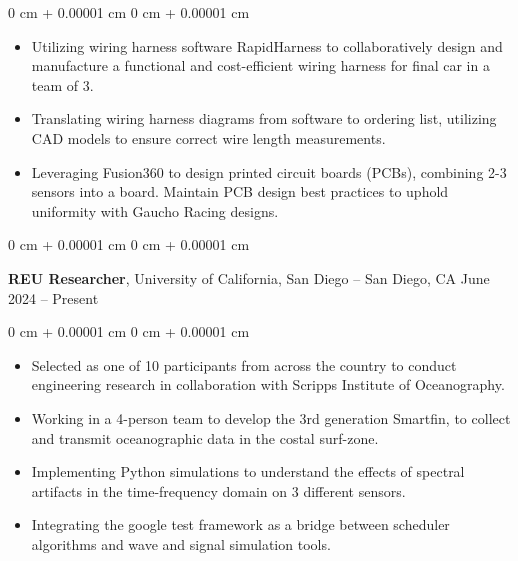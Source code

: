 \documentclass[10pt, letterpaper]{article}
\newenvironment{highlights}{
    \begin{itemize}[
        topsep=0.10 cm,
        parsep=0.10 cm,
        partopsep=0pt,
        itemsep=0pt,
        leftmargin=0 cm + 10pt
    ]
}{
    \end{itemize}
} %
\newenvironment{onecolentry}{
    \begin{adjustwidth}{
        0 cm + 0.00001 cm
    }{
        0 cm + 0.00001 cm
    }
}{
    \end{adjustwidth}
} %
\newenvironment{twocolentry}[2][]{
    \onecolentry
    \def\secondColumn{#2}
    \setcolumnwidth{\fill, 4.5 cm}
    \begin{paracol}{2}
}{
    \switchcolumn \raggedleft \secondColumn
    \end{paracol}
    \endonecolentry
} %
\begin{document}
    \vspace{0.10 cm}
    \begin{onecolentry}
        \begin{highlights}
            \item Utilizing wiring harness software RapidHarness to collaboratively design and manufacture a functional and cost-efficient wiring harness for final car in a team of 3.
            \item Translating wiring harness diagrams from software to ordering list, utilizing CAD models to ensure correct wire length measurements. 
            \item Leveraging Fusion360 to design printed circuit boards (PCBs), combining 2-3 sensors into a board. Maintain PCB design best practices to uphold uniformity with Gaucho Racing designs.
        \end{highlights}
    \end{onecolentry}
    



    \vspace{0.2 cm}

     \begin{twocolentry}{
        June 2024 – Present
    }
    
    \textbf{REU Researcher}, University of California, San Diego -- San Diego, CA\end{twocolentry}
    
    \vspace{0.1 cm}

    \begin{onecolentry}
        \begin{highlights}
            \item Selected as one of 10 participants from across the country to conduct engineering research in collaboration with Scripps Institute of Oceanography.
            \item Working in a 4-person team to develop the 3rd generation Smartfin, to collect and transmit oceanographic data in the costal surf-zone.
            \item Implementing Python simulations to understand the effects of spectral artifacts in the time-frequency domain on 3 different sensors. 
            \item Integrating the google test framework as a bridge between scheduler algorithms and wave and signal simulation tools.
        \end{highlights}
    \end{onecolentry}
\end{document}
